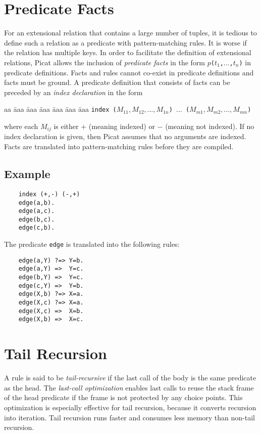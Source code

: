 \section{Predicate Facts}
For an extensional relation that contains a large number of tuples, it is tedious to define such a relation as a predicate with pattern-matching rules. It is worse if the relation has multiple keys. In order to facilitate the definition of extensional relations, Picat allows the inclusion of \emph{predicate facts} in the form \texttt{$p$($t_1$,$\ldots$,$t_n$)} in predicate definitions. Facts and rules cannot co-exist in predicate definitions and facts must be ground. A predicate definition that consists of facts can be preceded by an \emph{index declaration} in the form 
\begin{tabbing}
aa \= aaa \= aaa \= aaa \= aaa \= aaa \= aaa \kill
\> \texttt{index ($M_{11},M_{12},\ldots,M_{1n}$) $\ldots$ ($M_{m1},M_{m2},\ldots,M_{mn}$)} 
\end{tabbing}
where each $M_{ij}$ is either $+$ (meaning indexed) or $-$ (meaning not indexed). If no index declaration is given, then Picat assumes that no arguments are indexed. Facts are translated into pattern-matching rules before they are compiled. 

\subsection*{Example}
\begin{verbatim}
    index (+,-) (-,+)
    edge(a,b).
    edge(a,c).
    edge(b,c).
    edge(c,b).
\end{verbatim}
The predicate \texttt{edge} is translated into the following rules:
\begin{verbatim}
    edge(a,Y) ?=> Y=b.
    edge(a,Y) =>  Y=c.
    edge(b,Y) =>  Y=c.
    edge(c,Y) =>  Y=b.
    edge(X,b) ?=> X=a.
    edge(X,c) ?=> X=a.
    edge(X,c) =>  X=b.
    edge(X,b) =>  X=c.
\end{verbatim}

\section{Tail Recursion}
A rule is said to be \emph{tail-recursive} if the last call of the body is the same predicate as the head. The \emph{last-call optimization} enables last calls to reuse the stack frame of the head predicate if the frame is not protected by any choice points. This optimization is especially effective for tail recursion, because it converts recursion into iteration. Tail recursion runs faster and consumes less memory than non-tail recursion.

